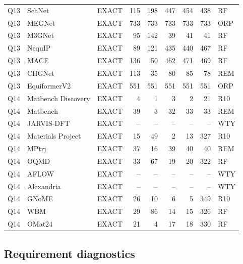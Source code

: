 \documentclass[11pt,a4paper]{article}
\begin{document}
{\begin{longtable}{@{}lp{3.0cm}lrrrrrl@{}}
Q13 & SchNet & EXACT & 115 & 198 & 447 & 454 & 438 & RF \\
Q13 & MEGNet & EXACT & 733 & 733 & 733 & 733 & 733 & ORP \\
Q13 & M3GNet & EXACT & 95 & 142 & 39 & 41 & 41 & RF \\
Q13 & NequIP & EXACT & 89 & 121 & 435 & 440 & 467 & RF \\
Q13 & MACE & EXACT & 136 & 50 & 462 & 471 & 469 & RF \\
Q13 & CHGNet & EXACT & 113 & 35 & 80 & 85 & 78 & REM \\
Q13 & EquiformerV2 & EXACT & 551 & 551 & 551 & 551 & 551 & ORP \\
Q14 & Matbench Discovery & EXACT & 4 & 1 & 3 & 2 & 21 & R10 \\
Q14 & Matbench & EXACT & 39 & 3 & 32 & 33 & 33 & REM \\
Q14 & JARVIS-DFT & EXACT & -- & -- & -- & -- & -- & WTY \\
Q14 & Materials Project & EXACT & 15 & 49 & 2 & 13 & 327 & R10 \\
Q14 & MPtrj & EXACT & 37 & 16 & 39 & 40 & 40 & REM \\
Q14 & OQMD & EXACT & 33 & 67 & 19 & 20 & 322 & RF \\
Q14 & AFLOW & EXACT & -- & -- & -- & -- & -- & WTY \\
Q14 & Alexandria & EXACT & -- & -- & -- & -- & -- & WTY \\
Q14 & GNoME & EXACT & 26 & 10 & 6 & 5 & 349 & R10 \\
Q14 & WBM & EXACT & 29 & 86 & 14 & 15 & 326 & RF \\
Q14 & OMat24 & EXACT & 21 & 4 & 17 & 18 & 330 & RF \\
\end{longtable}}

\subsection{Requirement diagnostics}
\end{document}
